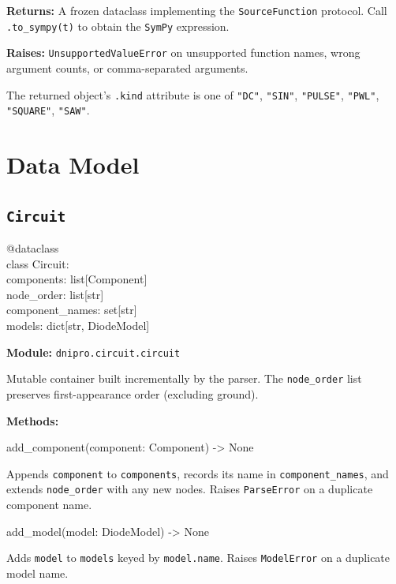 \documentclass[11pt,a4paper]{article}
\newcommand{\code}[1]{\texttt{#1}}
\newcommand{\sympy}{\texttt{SymPy}}
\newenvironment{apisig}{%
  \begin{trivlist}\item\relax\ttfamily\small
}{%
  \end{trivlist}
}
\begin{document}
\textbf{Returns:} A frozen dataclass implementing the \code{SourceFunction} protocol.
Call \code{.to\_sympy(t)} to obtain the \sympy{} expression.

\textbf{Raises:} \code{UnsupportedValueError} on unsupported function names,
wrong argument counts, or comma-separated arguments.

The returned object's \code{.kind} attribute is one of
\code{"DC"}, \code{"SIN"}, \code{"PULSE"}, \code{"PWL"}, \code{"SQUARE"}, \code{"SAW"}.

\section{Data Model}
\label{sec:api-data-model}

\subsection{\texttt{Circuit}}
\label{api:circuit}

\begin{apisig}
@dataclass \\
class Circuit: \\
\quad components: list[Component] \\
\quad node\_order: list[str] \\
\quad component\_names: set[str] \\
\quad models: dict[str, DiodeModel]
\end{apisig}

\textbf{Module:} \code{dnipro.circuit.circuit}

Mutable container built incrementally by the parser.
The \code{node\_order} list preserves first-appearance order (excluding ground).

\textbf{Methods:}

\begin{apisig}
add\_component(component: Component) -> None
\end{apisig}
Appends \code{component} to \code{components}, records its name in
\code{component\_names}, and extends \code{node\_order} with any new nodes.
Raises \code{ParseError} on a duplicate component name.

\begin{apisig}
add\_model(model: DiodeModel) -> None
\end{apisig}
Adds \code{model} to \code{models} keyed by \code{model.name}.
Raises \code{ModelError} on a duplicate model name.
\end{document}
